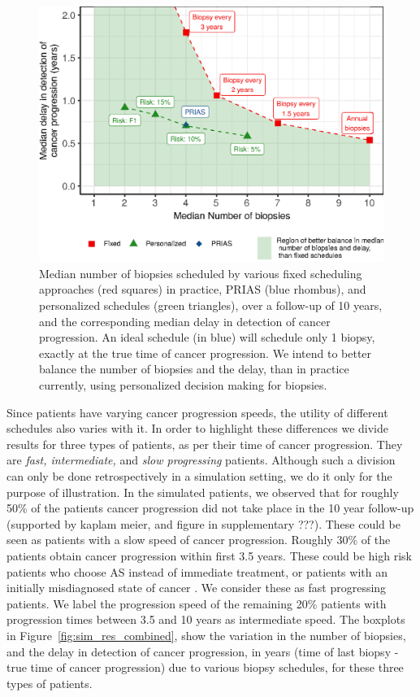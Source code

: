 \begin{figure}[!htb]
\captionsetup{justification=justified}
\centerline{\includegraphics[width=\columnwidth]{images/better_balance_results.eps}}
\caption{Median number of biopsies scheduled by various fixed scheduling approaches (red squares) in practice, PRIAS (blue rhombus), and personalized schedules (green triangles), over a follow-up of 10 years, and the corresponding median delay in detection of cancer progression. An ideal schedule (in blue) will schedule only 1 biopsy, exactly at the true time of cancer progression. We intend to better balance the number of biopsies and the delay, than in practice currently, using personalized decision making for biopsies.}
\label{fig:better_balance_results}
\end{figure}

Since patients have varying cancer progression speeds, the utility of different schedules also varies with it. In order to highlight these differences we divide results for three types of patients, as per their time of cancer progression. They are \textit{fast, intermediate,} and \textit{slow progressing} patients. Although such a division can only be done retrospectively in a simulation setting, we do it only for the purpose of illustration. In the simulated patients, we observed that for roughly 50\% of the patients cancer progression did not take place in the 10 year follow-up (supported by kaplam meier, and figure in supplementary ???). These could be seen as patients with a slow speed of cancer progression. Roughly 30\% of the patients obtain cancer progression within first 3.5 years. These could be high risk patients who choose AS instead of immediate treatment, or patients with an initially misdiagnosed state of cancer \cite{cooperberg2011outcomes}. We consider these as fast progressing patients. We label the progression speed of the remaining 20\% patients with progression times between 3.5 and 10 years as intermediate speed. The boxplots in Figure~\ref{fig:sim_res_combined}, show the variation in the number of biopsies, and the delay in detection of cancer progression, in years (time of last biopsy - true time of cancer progression) due to various biopsy schedules, for these three types of patients.

